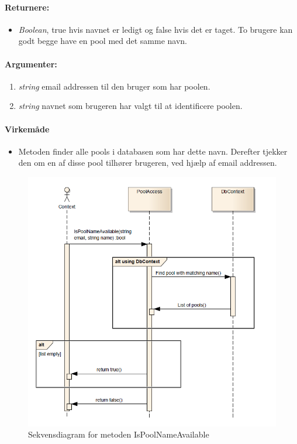 \paragraph{Returnere:}
\begin{itemize}
	\item \textit{Boolean}, true hvis navnet er ledigt og false hvis det er taget. To brugere kan godt begge have en pool med det samme navn.
\end{itemize}

\paragraph{Argumenter:}
\begin{enumerate}
	\item \textit{string} email addressen til den bruger som har poolen.
	\item \textit{string} navnet som brugeren har valgt til at identificere poolen.
\end{enumerate}

\paragraph{Virkemåde}
\begin{itemize}
	\item Metoden finder alle pools i databasen som har dette navn. Derefter tjekker den om en af disse pool tilhører brugeren, ved hjælp af email addressen.
\end{itemize}

\begin{figure}
\centering
\includegraphics[width=0.7\linewidth]{figs/dbSeq/isPoolNameAvailable}
\caption{Sekvensdiagram for metoden IsPoolNameAvailable}
\label{fig:isPoolNameAvailable}
\end{figure}








